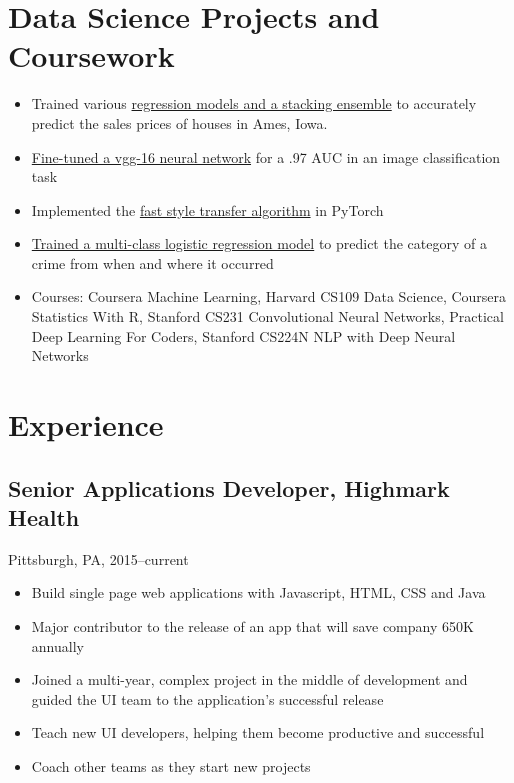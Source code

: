 \documentclass[11pt]{article}
\begin{document}
	\section{Data Science Projects and Coursework}
		\begin{itemize}
			\item Trained various \href{https://github.com/ryankresse/ames_housing}{ regression models and a stacking ensemble} to accurately predict the sales prices of houses in Ames, Iowa.
			\item \href{https://github.com/ryankresse/invasive_species}{Fine-tuned a vgg-16 neural network} for a .97 AUC in an image classification task 
			\item Implemented the \href{https://github.com/ryankresse/fast_style_transfer_pytorch}{fast style transfer algorithm} in PyTorch
			\item \href{https://github.com/ryankresse/sf-crime}{Trained a multi-class logistic regression model} to predict the category of a crime from when and where it occurred
			\item Courses: Coursera Machine Learning, Harvard CS109 Data Science, Coursera Statistics With R, Stanford CS231 Convolutional Neural Networks, Practical Deep Learning For Coders, Stanford CS224N NLP with Deep Neural Networks
		\end{itemize}
		
	\section{Experience}
			\subsection{\normalsize{Senior Applications Developer, Highmark Health}}
			{\fontsize{10pt}{\parskip}\selectfont Pittsburgh, PA, 2015--current}
		\begin{itemize}
		\item Build single page web applications with Javascript, HTML, CSS and Java
		\item Major contributor to the release of an app that will save company 650K annually
		\item Joined a multi-year, complex project in the middle of development and guided the UI team to the application's successful release
		\item Teach new UI developers, helping them become productive and successful
		\item Coach other teams as they start new projects
		\end{itemize}
		
\end{document}
